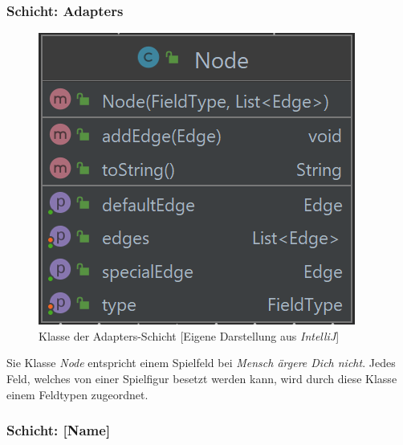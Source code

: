 \subsubsection{Schicht: Adapters}
\begin{figure}[htbp]
\centering
\centerline{\includegraphics[scale=.35]{node}}
\caption{Klasse der Adapters-Schicht [Eigene Darstellung aus \emph{IntelliJ}]}
\label{fig:dependencyrulenegativ}
\end{figure}
\noindent Sie Klasse \emph{Node} entspricht einem Spielfeld bei \emph{Mensch ärgere Dich nicht}. Jedes Feld, welches von einer Spielfigur besetzt werden kann, wird durch diese Klasse einem Feldtypen zugeordnet. 

\subsubsection{Schicht: [Name]}
